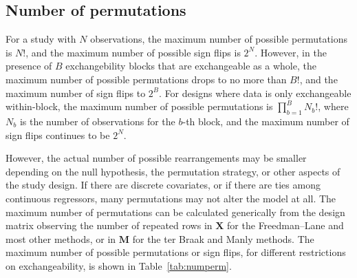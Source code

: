 \subsection{Number of permutations} 

For a study with $N$ observations, the maximum number of possible permutations is $N!$, and the maximum number of possible sign flips is $2^N$. However, in the presence of $B$ exchangebility blocks that are exchangeable as a whole, the maximum number of possible permutations drops to no more than $B!$, and the maximum number of sign flips to $2^B$. For designs where data is only exchangeable within-block, the maximum number of possible permutations is $\prod_{b=1}^{B} N_{b}!$, where $N_{b}$ is the number of observations for the $b$-th block, and the maximum number of sign flips continues to be $2^N$.

However, the actual number of possible rearrangements may be smaller depending on the null hypothesis, the permutation strategy, or other aspects of the study design. If there are discrete covariates, or if there are ties among continuous regressors, many permutations may not alter the model at all. The maximum number of permutations can be calculated generically from the design matrix observing the number of repeated rows in $\mathbf{X}$ for the Freedman--Lane and most other methods, or in $\mathbf{M}$ for the ter Braak and Manly methods. The maximum number of possible permutations or sign flips, for different restrictions on exchangeability, is shown in Table~\ref{tab:numperm}.

